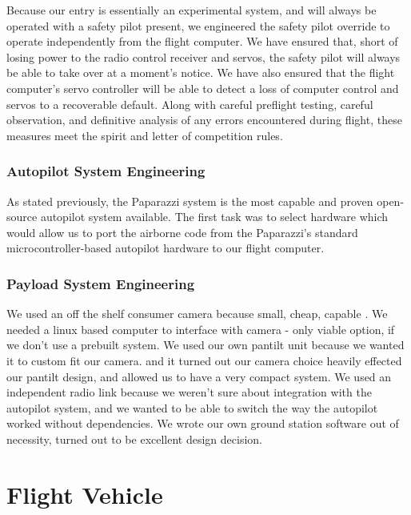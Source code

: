 \documentclass[10pt]{report}
\begin{document}
Because our entry is essentially an experimental system, and will always be operated with a safety pilot present, we engineered the safety pilot override to operate independently from the flight computer. We have ensured that, short of losing power to the radio control receiver and servos, the safety pilot will always be able to take over at a moment's notice. We have also ensured that the flight computer's servo controller will be able to detect a loss of computer control and servos to a recoverable default. Along with careful preflight testing, careful observation, and definitive analysis of any errors encountered during flight, these measures meet the spirit and letter of competition rules.

\subsubsection{Autopilot System Engineering}

As stated previously, the Paparazzi system is the most capable and proven open-source autopilot system available. The first task was to select hardware which would allow us to port the airborne code from the Paparazzi's standard microcontroller-based autopilot hardware to our flight computer.

\subsubsection{Payload System Engineering}
We used an off the shelf consumer camera because small, cheap, capable .
We needed a linux based computer to interface with camera - only viable option, if we don't use a prebuilt system.
We used our own pantilt unit because we wanted it to custom fit our camera.
and it turned out our camera choice heavily effected our pantilt design, and allowed us to have a very compact system.
 We used an independent radio link because we weren't sure about integration with the autopilot system, and we wanted to be able to switch the way the autopilot worked without dependencies.
We wrote our own ground station software out of necessity, turned out to be excellent design decision.



\section{Flight Vehicle}
\end{document}
